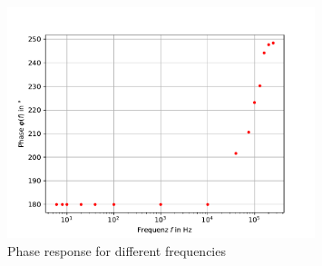 \documentclass[11pt, a4paper]{article}
\begin{document}
\begin{figure}[h]
    \centering
    \includegraphics[width=0.8\textwidth]{plots/Phasengang.pdf}
    \caption{Phase response for different frequencies}
    \label{fig:Pharesp}
\end{figure}




\end{document}
